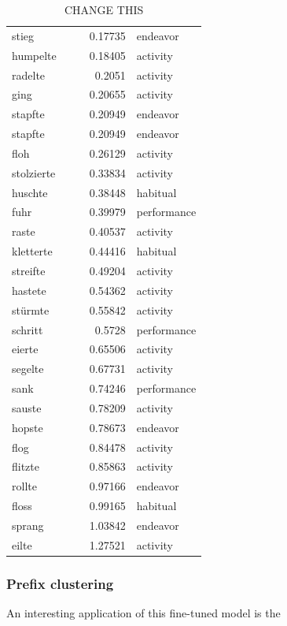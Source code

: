 \begin{table}[h!]
\begin{tabular}[t]{|l|c|c|r|l|}
        stieg &  &  & 0.17735 & endeavor\\
        humpelte &  &  & 0.18405 & activity\\
        radelte &  &  & 0.2051 & activity\\
        ging &  &  & 0.20655 & activity\\
        stapfte &  &  & 0.20949 & endeavor\\
        stapfte &  &  & 0.20949 & endeavor\\
        floh &  &  & 0.26129 & activity\\
        stolzierte &  &  & 0.33834 & activity\\
        huschte &  &  & 0.38448 & habitual\\
        fuhr &  &  & 0.39979 & performance\\
        raste &  &  & 0.40537 & activity\\
        kletterte &  &  & 0.44416 & habitual\\
        streifte &  &  & 0.49204 & activity\\
        hastete &  &  & 0.54362 & activity\\
        stürmte &  &  & 0.55842 & activity\\
        schritt &  &  & 0.5728 & performance\\
        eierte &  &  & 0.65506 & activity\\
        segelte &  &  & 0.67731 & activity\\
        sank &  &  & 0.74246 & performance\\
        sauste &  &  & 0.78209 & activity\\
        hopste &  &  & 0.78673 & endeavor\\
        flog &  &  & 0.84478 & activity\\
        flitzte &  &  & 0.85863 & activity\\
        rollte &  &  & 0.97166 & endeavor\\
        floss &  &  & 0.99165 & habitual\\
        sprang &  &  & 1.03842 & endeavor\\
        eilte &  &  & 1.27521 & activity\\
        \hline
    \end{tabular}
    \caption{CHANGE THIS}
\end{table}


\subsubsection{Prefix clustering}
An interesting application of this fine-tuned model is the 

